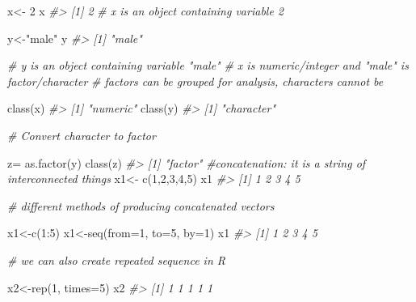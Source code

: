 \documentclass[
]{book}
\newenvironment{Shaded}{\begin{snugshade}}{\end{snugshade}}
\newcommand{\AttributeTok}[1]{\textcolor[rgb]{0.77,0.63,0.00}{#1}}
\newcommand{\CommentTok}[1]{\textcolor[rgb]{0.56,0.35,0.01}{\textit{#1}}}
\newcommand{\DecValTok}[1]{\textcolor[rgb]{0.00,0.00,0.81}{#1}}
\newcommand{\FunctionTok}[1]{\textcolor[rgb]{0.00,0.00,0.00}{#1}}
\newcommand{\NormalTok}[1]{#1}
\newcommand{\OtherTok}[1]{\textcolor[rgb]{0.56,0.35,0.01}{#1}}
\newcommand{\SpecialCharTok}[1]{\textcolor[rgb]{0.00,0.00,0.00}{#1}}
\newcommand{\StringTok}[1]{\textcolor[rgb]{0.31,0.60,0.02}{#1}}
\begin{document}
\begin{Shaded}
\begin{Highlighting}[]
\NormalTok{x}\OtherTok{\textless{}{-}} \DecValTok{2}
\NormalTok{x}
\CommentTok{\#\textgreater{} [1] 2}
\CommentTok{\# x is an object containing variable 2}

\NormalTok{y}\OtherTok{\textless{}{-}}\StringTok{"male"}
\NormalTok{y}
\CommentTok{\#\textgreater{} [1] "male"}

\CommentTok{\# y is an object containing variable "male"}
\CommentTok{\# x is numeric/integer and "male" is factor/character}
\CommentTok{\# factors can be grouped for analysis, characters cannot be}

\FunctionTok{class}\NormalTok{(x)}
\CommentTok{\#\textgreater{} [1] "numeric"}
\FunctionTok{class}\NormalTok{(y)}
\CommentTok{\#\textgreater{} [1] "character"}



\CommentTok{\# Convert character to factor}

\NormalTok{z}\OtherTok{=} \FunctionTok{as.factor}\NormalTok{(y)}
\FunctionTok{class}\NormalTok{(z)}
\CommentTok{\#\textgreater{} [1] "factor"}
\CommentTok{\#concatenation: it is a string of interconnected things}
\NormalTok{x1}\OtherTok{\textless{}{-}} \FunctionTok{c}\NormalTok{(}\DecValTok{1}\NormalTok{,}\DecValTok{2}\NormalTok{,}\DecValTok{3}\NormalTok{,}\DecValTok{4}\NormalTok{,}\DecValTok{5}\NormalTok{)}
\NormalTok{x1}
\CommentTok{\#\textgreater{} [1] 1 2 3 4 5}

\CommentTok{\# different methods of producing concatenated vectors}

\NormalTok{x1}\OtherTok{\textless{}{-}}\FunctionTok{c}\NormalTok{(}\DecValTok{1}\SpecialCharTok{:}\DecValTok{5}\NormalTok{)}
\NormalTok{x1}\OtherTok{\textless{}{-}}\FunctionTok{seq}\NormalTok{(}\AttributeTok{from=}\DecValTok{1}\NormalTok{, }\AttributeTok{to=}\DecValTok{5}\NormalTok{, }\AttributeTok{by=}\DecValTok{1}\NormalTok{)}
\NormalTok{x1}
\CommentTok{\#\textgreater{} [1] 1 2 3 4 5}

\CommentTok{\# we can also create repeated sequence in R}

\NormalTok{x2}\OtherTok{\textless{}{-}}\FunctionTok{rep}\NormalTok{(}\DecValTok{1}\NormalTok{, }\AttributeTok{times=}\DecValTok{5}\NormalTok{)}
\NormalTok{x2}
\CommentTok{\#\textgreater{} [1] 1 1 1 1 1}


\end{Highlighting}
\end{Shaded}
\end{document}
